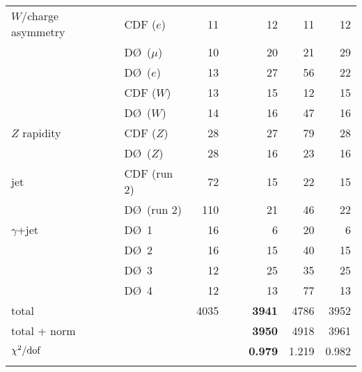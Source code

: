 \documentclass[aps,prd,amsmath,preprint]{revtex4}
\begin{document}
\begin{table}[t]
{\begin{tabular}[c]{llrrrr}
$W/$charge asymmetry
  & CDF  ($e$)		\cite{CDF_e}    &  11 &  12 &  11 &  12 \\
  & D\O\ ($\mu$)  	\cite{D0_mu}    &  10 &  20 &  21 &  29 \\  
  & D\O\ ($e$) 		\cite{D0_e}     &  13 &  27 &  56 &  22 \\
  & CDF  ($W$)    	\cite{CDF_W}    &  13 &  15 &  12 &  15 \\
  & D\O\ ($W$)    	\cite{D0_W}     &  14 &  16 &  47 &  16 \\
$Z$ rapidity
  & CDF  ($Z$)		\cite{CDFZ}     &  28 &  27 &  79 &  28 \\ 
  & D\O\ ($Z$)		\cite{D0Z}      &  28 &  16 &  23 &  16 \\
jet
  & CDF  (run 2)       	\cite{CDFjet2}  &  72 &  15 &  22 &  15 \\
  & D\O\ (run 2)       	\cite{D0jet2}   & 110 &  21 &  46 &  22 \\
$\gamma$+jet
  & D\O\ 1           	\cite{D0gamjet} &  16 &   6 &  20 &   6 \\    
  & D\O\ 2           	\cite{D0gamjet} &  16 &  15 &  40 &  15 \\
  & D\O\ 3           	\cite{D0gamjet} &  12 &  25 &  35 &  25 \\
  & D\O\ 4           	\cite{D0gamjet} &  12 &  13 &  77 &  13 \\ \hline
%
total        		&		& 4035 &\ \ \ \ {\bf 3941} & 4786 & 3952 \\
total + norm 		&		&      &\ \ \ \ {\bf 3950} & 4918 & 3961 \\ \hline
$\chi^2/{\rm dof}$	&		&      & {\bf 0.979} & 1.219 & 0.982 \\  \hline\\
%
\end{tabular}
}
\label{tab:chi2}
\end{table}
\end{document}
